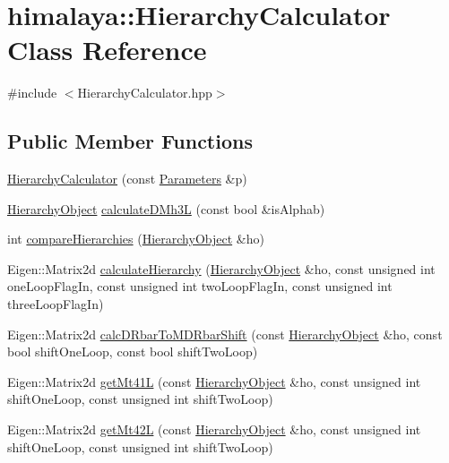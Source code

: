\hypertarget{classhimalaya_1_1HierarchyCalculator}{}\section{himalaya\+:\+:Hierarchy\+Calculator Class Reference}
\label{classhimalaya_1_1HierarchyCalculator}


{\ttfamily \#include $<$Hierarchy\+Calculator.\+hpp$>$}

\subsection*{Public Member Functions}
\begin{DoxyCompactItemize}
\item 
\hyperlink{classhimalaya_1_1HierarchyCalculator_a8d1d3911a84f05c234e0f66bd80d77e4}{Hierarchy\+Calculator} (const \hyperlink{structhimalaya_1_1Parameters}{Parameters} \&p)
\item 
\hyperlink{classhimalaya_1_1HierarchyObject}{Hierarchy\+Object} \hyperlink{classhimalaya_1_1HierarchyCalculator_abf7f5305373058bea5b173e734d07d6c}{calculate\+D\+Mh3L} (const bool \&is\+Alphab)
\item 
int \hyperlink{classhimalaya_1_1HierarchyCalculator_a6ae7d2bf7742c1a961a79bab4c860378}{compare\+Hierarchies} (\hyperlink{classhimalaya_1_1HierarchyObject}{Hierarchy\+Object} \&ho)
\item 
Eigen\+::\+Matrix2d \hyperlink{classhimalaya_1_1HierarchyCalculator_aa9a5d68155fa1b5d7376d9bf08470946}{calculate\+Hierarchy} (\hyperlink{classhimalaya_1_1HierarchyObject}{Hierarchy\+Object} \&ho, const unsigned int one\+Loop\+Flag\+In, const unsigned int two\+Loop\+Flag\+In, const unsigned int three\+Loop\+Flag\+In)
\item 
Eigen\+::\+Matrix2d \hyperlink{classhimalaya_1_1HierarchyCalculator_ab0e05fd01311e162d50acc741dcc9f8b}{calc\+D\+Rbar\+To\+M\+D\+Rbar\+Shift} (const \hyperlink{classhimalaya_1_1HierarchyObject}{Hierarchy\+Object} \&ho, const bool shift\+One\+Loop, const bool shift\+Two\+Loop)
\item 
Eigen\+::\+Matrix2d \hyperlink{classhimalaya_1_1HierarchyCalculator_a2366610066b408bbad9aeba98ada07fb}{get\+Mt41L} (const \hyperlink{classhimalaya_1_1HierarchyObject}{Hierarchy\+Object} \&ho, const unsigned int shift\+One\+Loop, const unsigned int shift\+Two\+Loop)
\item 
Eigen\+::\+Matrix2d \hyperlink{classhimalaya_1_1HierarchyCalculator_aa35b62a12a4f97b77830abf292858b05}{get\+Mt42L} (const \hyperlink{classhimalaya_1_1HierarchyObject}{Hierarchy\+Object} \&ho, const unsigned int shift\+One\+Loop, const unsigned int shift\+Two\+Loop)

\end{DoxyCompactItemize}
